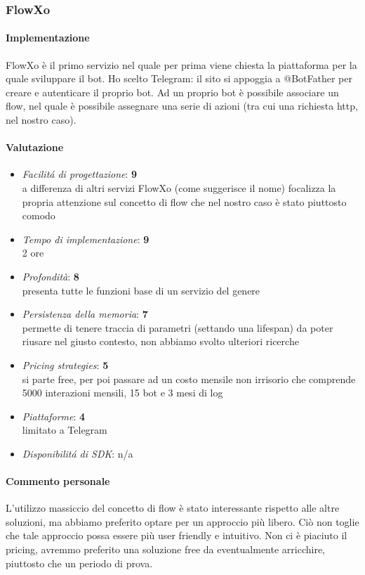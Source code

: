 \documentclass[]{article}
\begin{document}
\subsubsection{FlowXo}
\paragraph{Implementazione}
FlowXo è il primo servizio nel quale per prima viene chiesta la piattaforma per la quale sviluppare il bot. Ho scelto Telegram: il sito si appoggia a @BotFather per creare e autenticare il proprio bot. Ad un proprio bot è possibile associare un flow, nel quale è possibile assegnare una serie di azioni (tra cui una richiesta http, nel nostro caso).
\paragraph{Valutazione}
\begin{itemize}
\item \textit{Facilitá di progettazione}: \textbf{9} \\ a differenza di altri servizi FlowXo (come suggerisce il nome) focalizza la propria attenzione sul concetto di flow che nel nostro caso è stato piuttosto comodo
\item \textit{Tempo di implementazione}: \textbf{9} \\ 2 ore
\item \textit{Profondità}: \textbf{8} \\ presenta tutte le funzioni base di un servizio del genere
\item \textit{Persistenza della memoria}: \textbf{7} \\ permette di tenere traccia di parametri (settando una lifespan) da poter riusare nel giusto contesto, non abbiamo svolto ulteriori ricerche
\item \textit{Pricing strategies}: \textbf{5} \\ si parte free, per poi passare ad un costo mensile non irrisorio che comprende 5000 interazioni mensili, 15 bot e 3 mesi di log
\item \textit{Piattaforme}: \textbf{4} \\ limitato a Telegram
\item \textit{Disponibilitá di SDK}: n/a
\end{itemize}

\paragraph{Commento personale}
L’utilizzo massiccio del concetto di flow è stato interessante rispetto alle altre soluzioni, ma abbiamo preferito optare per un approccio più libero. Ciò non toglie che tale approccio possa essere più user friendly e intuitivo. Non ci è piaciuto il pricing, avremmo preferito una soluzione free da eventualmente arricchire, piuttosto che un periodo di prova.
\end{document}
